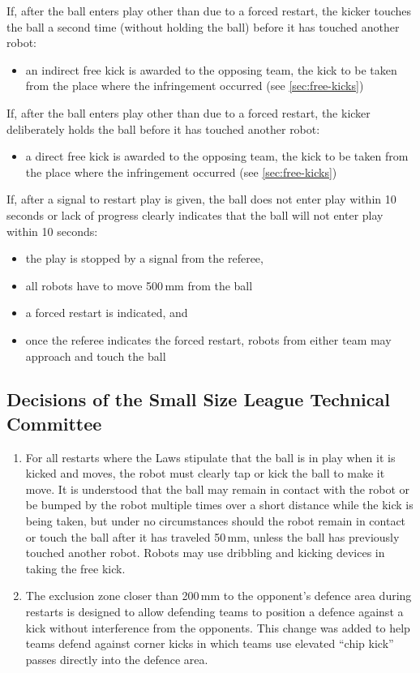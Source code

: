 If, after the ball enters play other than due to a forced restart, the kicker touches the ball a second time (without holding the ball) before it has touched another robot:
\begin{itemize}
\item an indirect free kick is awarded to the opposing team, the kick to be taken from the place where the infringement occurred (see \autoref{sec:free-kicks})
\end{itemize}

If, after the ball enters play other than due to a forced restart, the kicker deliberately holds the ball before it has touched another robot:
\begin{itemize}
\item a direct free kick is awarded to the opposing team, the kick to be taken from the place where the infringement occurred (see \autoref{sec:free-kicks})
\end{itemize}

If, after a signal to restart play is given, the ball does not enter play within 10 seconds or lack of progress clearly indicates that the ball will not enter play within 10 seconds:
\begin{itemize}
\item the play is stopped by a signal from the referee,
\item all robots have to move 500\,mm from the ball
\item a forced restart is indicated, and
\item once the referee indicates the forced restart, robots from either team may approach and touch the ball
\end{itemize}

\subsection*{Decisions of the Small Size League Technical Committee}
\begin{enumerate}
\item
For all restarts where the Laws stipulate that the ball is in play when it is kicked and moves, the robot must clearly tap or kick the ball to make it move.
It is understood that the ball may remain in contact with the robot or be bumped by the robot multiple times over a short distance while the kick is being taken, but under no circumstances should the robot remain in contact or touch the ball after it has traveled 50\,mm, unless the ball has previously touched another robot.
Robots may use dribbling and kicking devices in taking the free kick.

\item
The exclusion zone closer than 200\,mm to the opponent's defence area during restarts is designed to allow defending teams to position a defence against a kick without interference from the opponents.
This change was added to help teams defend against corner kicks in which teams use elevated ``chip kick'' passes directly into the defence area.
\end{enumerate}
